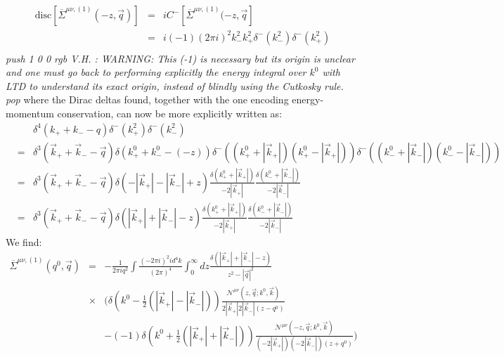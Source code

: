 \documentclass[11pt]{article}
\def\cmtVH#1{\emph{\pdfcolorstack\MyArticleWithColor push {1 0 0 rgb} V.H. : #1 \pdfcolorstack\MyArticleWithColor pop}}
\begin{document}
\begin{eqnarray}
\textrm{disc} \left[ \overline{\Sigma}^{\mu\nu,(1)}(-z, \vec{q}) \right] &=& i C^-\left[ \overline{\Sigma}^{\mu\nu,(1)}(-z, \vec{q} \right] \nonumber \\
&=& i (-1) (2\pi i)^2 k_{-}^2 k_{+}^2 \delta^-\left(k_{-}^2\right) \delta^-\left(k_{+}^2\right)  \nonumber \\
\label{NegativeEnergyCutkoskyRule}
\end{eqnarray}
\cmtVH{WARNING: This (-1) is necessary but its origin is unclear and one must go back to performing explicitly the energy integral over $k^0$ with LTD to understand its exact origin, instead of blindly using the Cutkosky rule.}
where the Dirac deltas found, together with the one encoding energy-momentum conservation, can now be more explicitly written as:
\begin{eqnarray}
&&\delta^4(k_{+}+k_{-}-q)\delta^-\left(k_{+}^2 \right) \delta^-\left(k_{-}^2\right)\nonumber\\
&=& \delta^3(\vec{k}_{+}+\vec{k}_{-}-\vec{q})\delta(k_{+}^{0}+k_{-}^{0}-(-z))
\delta^- \left( (k_{+}^{0}+|\vec{k}_{+}|)(k_{+}^0-|\vec{k}_{+}|) \right)
\delta^- \left( (k_{-}^0+|\vec{k}_{-}|)(k_{-}^0-|\vec{k}_{-}|) \right) \nonumber \\ 
&=& \delta^3(\vec{k}_{+}+\vec{k}_{-}-\vec{q})\delta(-|\vec{k}_{+}|-|\vec{k}_{-}|+z)
\frac{\delta \left( k_{+}^{0}+|\vec{k}_{+}| \right) }{-2|\vec{k}_{+}|}
\frac{\delta \left( k_{-}^{0}+|\vec{k}_{-}| \right) }{-2|\vec{k}_{-}|}\nonumber\\
&=& \delta^3(\vec{k}_{+}+\vec{k}_{-}-\vec{q})\delta(|\vec{k}_{+}|+|\vec{k}_{-}|-z)
\frac{\delta \left( k_{+}^{0}+|\vec{k}_{+}| \right) }{-2|\vec{k}_{+}|}
\frac{\delta \left( k_{-}^{0}+|\vec{k}_{-}| \right) }{-2|\vec{k}_{-}|}
\end{eqnarray}
We find:
\begin{eqnarray}
\overline{\Sigma}^{\mu\nu,(1)}(q^0, \vec{q}) &=& -\frac{1}{ 2 \pi i q^2}  \int \frac{(-2\pi i)^2 i d^4 k}{(2\pi)^4} \int_{0}^\infty d z \frac{ \delta\left(|\vec{k}_{+}|+|\vec{k}_{-}|-z\right) } {z^2-|\vec{q}|^2}  \nonumber \\
&\times&\Bigg (\delta \left(k^0 - \frac{1}{2}(|\vec{k}_{+}|-|\vec{k}_{-}|) \right) \frac{ \mathcal{N}^{\mu\nu} \left(  z, \vec{q} ; k^0, \vec{k} \right) }{ 2|\vec{k}_{+}|2|\vec{k}_{-}|(z-q^0) } \nonumber \\
&&- (-1)\delta \left(k^0 + \frac{1}{2}(|\vec{k}_{+}|+|\vec{k}_{-}|) \right) \frac{ \mathcal{N}^{\mu\nu} \left(  -z, \vec{q} ; k^0, \vec{k} \right) }{ (-2|\vec{k}_{+}|)(-2|\vec{k}_{-}|)(z+q^0) }
\Bigg )
 \nonumber\\
\end{eqnarray}
\end{document}
